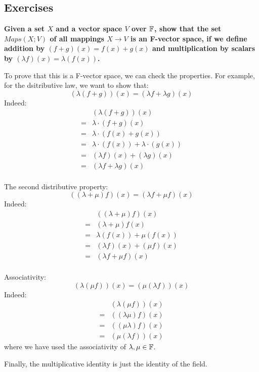 \documentclass{exam}
\begin{document}
\subsection{Exercises}

\begin{questions}

\question \textbf{Given a set $X$ and a vector space $V$ over $\mathbb{F}$, show that the set $Maps(X; V)$ of all mappings
$X \to V$ is an F-vector space, if we define addition by $(f + g)(x) = f(x) + g(x)$ and multiplication by scalars by
$(\lambda f)(x) = \lambda(f(x))$.}

\bigskip

To prove that this is a F-vector space, we can check the properties. For example, for the dsitributive law, we want to show that:
\[
(\lambda(f + g))(x) = (\lambda f + \lambda g)(x)
\]
Indeed:
\begin{align*}
    &(\lambda(f + g))(x) \\
    =& \lambda \cdot (f + g)(x) \\
    =& \lambda \cdot (f(x) + g(x)) \\
    =& \lambda \cdot (f(x)) + \lambda \cdot (g(x)) \\
    =& (\lambda f)(x) + (\lambda g)(x) \\
    =& (\lambda f + \lambda g)(x) \\
\end{align*}

The second distributive property:
\[
((\lambda + \mu)f)(x) = (\lambda f + \mu f)(x)
\]
Indeed:
\begin{align*}
    &((\lambda + \mu)f)(x) \\
    = &(\lambda + \mu)f(x) \\
    = &\lambda (f(x)) + \mu(f(x)) \\
    = &(\lambda f)(x) + (\mu f)(x) \\
    = &(\lambda f + \mu f)(x) \\
\end{align*}

Associativity:
\[
(\lambda(\mu f))(x) = (\mu(\lambda f))(x)
\]
Indeed:
\begin{align*}
    &(\lambda(\mu f))(x) \\
    =& ((\lambda \mu)f)(x) \\
    =& ((\mu \lambda)f)(x) \\
    =& (\mu(\lambda f))(x)
\end{align*}
where we have used the associativity of $\lambda, \mu \in \mathbb{F}$.

Finally, the multiplicative identity is just the identity of the field.

\end{questions}
\end{document}
